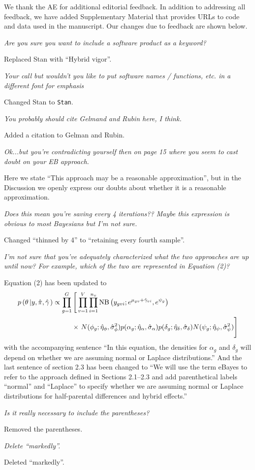 \documentclass{article}
\newcommand{\comment}[1]{\textit{#1}}
\newcommand{\response}[1]{#1}
\begin{document}
\response{We thank the AE for additional editorial feedback. In addition to addressing all feedback, we have added Supplementary Material that provides URLs to code and data used in the manuscript. Our changes due to feedback are shown below.}

\comment{Are you sure you want to include a software product as a keyword?}

\response{Replaced Stan with ``Hybrid vigor''.}

\comment{Your call but wouldn't you like to put software names / functions, etc. in a different font for emphasis}

\response{Changed Stan to {\tt Stan}.}

\comment{You probably should cite Gelmand and Rubin here, I think.}

\response{Added a citation to Gelman and Rubin.}

\comment{Ok...but you're contradicting yourself then on page 15 where you seem to cast doubt on your EB approach.}

\response{Here we state ``This approach may be a reasonable approximation'', but in the Discussion we openly express our doubts about whether it is a reasonable approximation.}

\comment{Does this mean you're saving every 4 iterations?? Maybe this expression is obvious to most Bayesians but I'm not sure.}

\response{Changed ``thinned by 4'' to ``retaining every fourth sample''.}

\comment{I'm not sure that you've adequately characterized what the two approaches are up until now? For example, which of the two are represented in Equation (2)?}

\response{Equation (2) has been updated to 
\begin{equation}
\begin{split}
p\left(\theta\left|y,\hat{\pi},\hat{\gamma}\right.\right) 
\propto \prod_{g=1}^G & \left[ \,\prod_{v=1}^V \prod_{i=1}^{n_v} \mbox{NB}\left(y_{gvi};e^{\mu_{gv}+\hat{\gamma}_{vi}},e^{\psi_g}\right)  \right. \\
&\times 
\left. \vphantom{\prod_{v=1}^V}
N(\phi_g;\hat{\eta}_\phi, \hat{\sigma}_\phi^2)
p(\alpha_g;\hat{\eta}_\alpha, \hat{\sigma}_\alpha)
p(\delta_g;\hat{\eta}_\delta, \hat{\sigma}_\delta)
N(\psi_g;\hat{\eta}_\psi, \hat{\sigma}_\psi^2) 
\right]
\label{e:condind}
\end{split}
\end{equation}
with the accompanying sentence ``In this equation, the densities for $\alpha_g$ and $\delta_g$ will depend on whether we are assuming normal or Laplace distributions.'' And the last sentence of section 2.3 has been changed to ``We will use the term eBayes to refer to the approach defined in Sections 2.1--2.3 and add parenthetical labels ``normal'' and ``Laplace'' to specify whether we are assuming normal or Laplace distributions for half-parental differences and hybrid effects.''}

\comment{Is it really necessary to include the parentheses?}

\response{Removed the parentheses.}

\comment{Delete ``markedly''.}

\response{Deleted ``markedly''.}
\end{document}
